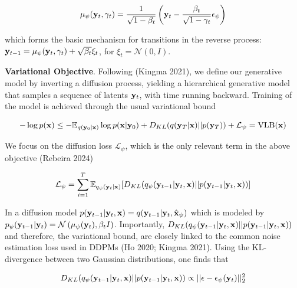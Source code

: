 \documentclass{article}
\begin{document}
\begin{equation}
\mu_{\psi}(\bold{y}_{t},\gamma_{t}) = \frac{1}{\sqrt{1-\beta_{t}}}\left(\bold{y}_{t} - \frac{\beta_{t}}{\sqrt{1-\gamma_{t}}}\epsilon_{\psi}\right)
\end{equation}

which forms the basic mechanism for transitions in the reverse process: $\bold{y}_{t-1} = \mu_{\psi}(\bold{y}_{t},\gamma_{t}) + \sqrt{\beta_{t}}\xi_{t}$, for $\xi_{t} = \mathcal{N}(0,I)$.

\textbf{Variational Objective}. Following (Kingma 2021), we define our generative model by inverting a diffusion process, yielding a hierarchical generative model that samples a sequence of latents $\bold{y}_{t}$, with time running backward. Training of the model is achieved through the usual variational bound

\begin{equation}
-\log p(\bold{x}) \leq -\mathbb{E}_{q(\bold{y}_{0}|\bold{x})} \log p(\bold{x}|\bold{y}_{0}) + D_{KL}(q(\bold{y}_{T}|\bold{x}) || p(\bold{y}_{T})) + \mathcal{L}_{\psi} = \mathrm{VLB}(\bold{x})
\end{equation}

We focus on the diffusion loss $\mathcal{L}_{\psi}$, which is the only relevant term in the above objective (Rebeira 2024)

\begin{equation}
\mathcal{L}_{\psi} = \sum_{i=1}^{T} \mathbb{E}_{q_{\psi}(\bold{y}_{t}|\bold{x})} [ D_{KL}(q_{\psi}(\bold{y}_{t-1}|\bold{y}_{t},\bold{x}) || p(\bold{y}_{t-1}|\bold{y}_{t},\bold{x})) ]
\end{equation}

In a diffusion model $p(\bold{y}_{t-1}|\bold{y}_{t},\bold{x}) = q(\bold{y}_{t-1}|\bold{y}_{t},\hat{\bold{x}}_{\psi})$ which is modeled by $p_{\psi}(\bold{y}_{t-1}|\bold{y}_{t}) = \mathcal{N}\left(\mu_{\psi}(\bold{y}_{t}),\beta_{t}I\right)$. Importantly, $D_{KL}(q_{\psi}(\bold{y}_{t-1}|\bold{y}_{t},\bold{x}) || p(\bold{y}_{t-1}|\bold{y}_{t},\bold{x}))$ and therefore, the variational bound, are closely linked to the common noise estimation loss used in DDPMs (Ho 2020; Kingma 2021). Using the KL-divergence between two Gaussian distributions, one finds that 

\begin{equation}
D_{KL}(q_{\psi}(\bold{y}_{t-1}|\bold{y}_{t},\bold{x}) || p(\bold{y}_{t-1}|\bold{y}_{t},\bold{x})) \propto   \lvert\lvert \epsilon - \epsilon_{\psi}(\bold{y}_{t}) \lvert\lvert_{2}^{2}
\end{equation}
\end{document}
